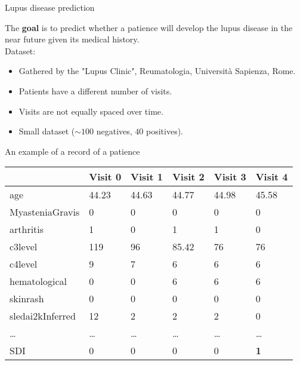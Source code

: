 

\begin{frame}{Lupus disease prediction}

	The \textbf{goal} is to predict whether a patience will develop the lupus disease in the near future given its medical history.
	\vspace{2em}\\
	Dataset:
	\begin{itemize}
		\item Gathered by the "Lupus Clinic", Reumatologia, Università Sapienza, Rome.
		\item Patients have a different number of visits.
		\item Visits are not equally spaced over time.
		\item Small dataset ($\sim100$ negatives, $40$ positives).
	\end{itemize}

\end{frame}

\begin{frame}{An example of a record of a patience}
\begin{table}[H]
	\centering
	\begin{tabular}{ C{2.5cm} | C{1cm} C{1cm} C{1cm} C{1cm} C{1cm}}
		& Visit 0 & Visit 1 & Visit 2 & Visit 3 & Visit 4 \\
		\hline
		age & 44.23 & 44.63 & 44.77 & 44.98 & 45.58 \\
		MyasteniaGravis & 0 & 0 & 0 & 0 & 0 \\
		arthritis & 1 & 0 & 1 & 1 & 0 \\
		c3level & 119 & 96 & 85.42 & 76 & 76 \\
		c4level & 9 & 7 & 6 & 6 & 6 \\
		hematological & 0 & 0 & 6 & 6 & 6 \\
		skinrash & 0 & 0 & 0 & 0 & 0 \\
		sledai2kInferred & 12 & 2 & 2 & 2 & 0 \\
		\dots & \dots & \dots & \dots & \dots & \dots \\
		\hline
		SDI & 0 & 0 & 0 & 0 & \textbf{1}\\
	\end{tabular}
\end{table}	
\end{frame}


